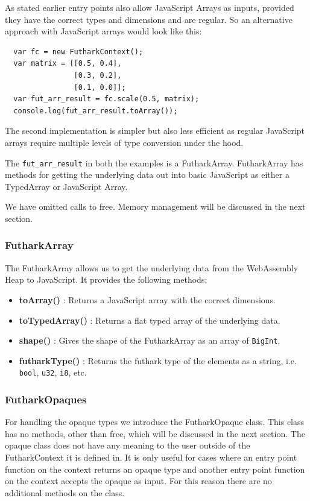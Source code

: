 \documentclass[11pt]{book}
\newcommand{\textBf}[1]{\textbf{#1}}
\begin{document}
As stated earlier entry points also allow JavaScript Arrays as inputs, provided they have the correct types and dimensions and are regular. So an alternative approach with JavaScript arrays would look like this:

\begin{verbatim}
  var fc = new FutharkContext();
  var matrix = [[0.5, 0.4], 
                [0.3, 0.2],
                [0.1, 0.0]];
  var fut_arr_result = fc.scale(0.5, matrix);
  console.log(fut_arr_result.toArray());
\end{verbatim}

The second implementation is simpler but also less efficient as regular JavaScript arrays require multiple levels of type conversion under the hood.

The \texttt{fut\_arr\_result} in both the examples is a FutharkArray. FutharkArray has methods for getting the underlying data out into basic JavaScript as either a TypedArray or JavaScript Array.

We have omitted calls to free. Memory management will be discussed in the next section.
\subsubsection*{FutharkArray}
The FutharkArray allows us to get the underlying data from the WebAssembly Heap to JavaScript. It provides the following methods:

\begin{itemize}
    \item \textBf{toArray()} :
    Returns a JavaScript array with the correct dimensions.
    \item \textBf{toTypedArray()} :
    Returns a flat typed array of the underlying data.
    \item \textBf{shape()} :
    Gives the shape of the FutharkArray as an array of \texttt{BigInt}.
    \item \textBf{futharkType()} :
    Returns the futhark type of the elements as a string, i.e. \texttt{bool}, \texttt{u32}, \texttt{i8}, etc.
\end{itemize}


\subsubsection*{FutharkOpaques}
For handling the opaque types we introduce the FutharkOpaque class. This class has no methods, other than free, which will be discussed in the next section. The opaque class does not have any meaning to the user outside of the FutharkContext it is defined in. It is only useful for cases where an entry point function on the context returns an opaque type and another entry point function on the context accepts the opaque as input. For this reason there are no additional methods on the class. 
\end{document}
